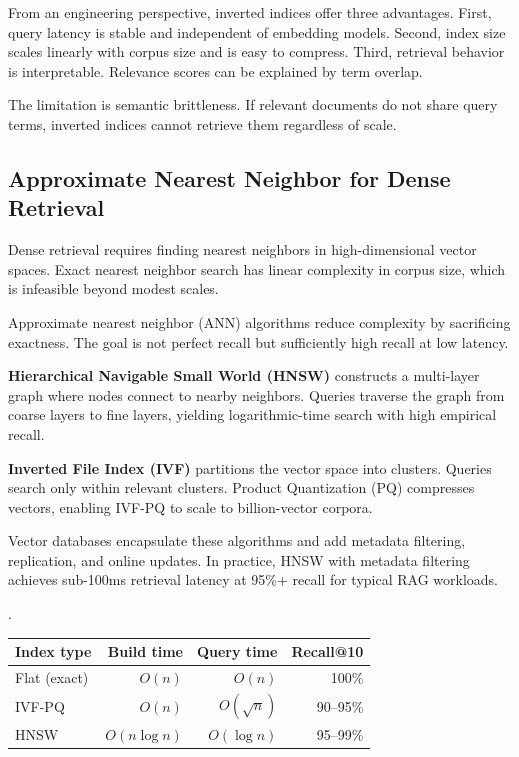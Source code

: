 From an engineering perspective, inverted indices offer three advantages. First, query latency is stable and independent of embedding models. Second, index size scales linearly with corpus size and is easy to compress. Third, retrieval behavior is interpretable. Relevance scores can be explained by term overlap.

The limitation is semantic brittleness. If relevant documents do not share query terms, inverted indices cannot retrieve them regardless of scale.

\subsection{Approximate Nearest Neighbor for Dense Retrieval}

Dense retrieval requires finding nearest neighbors in high-dimensional vector spaces. Exact nearest neighbor search has linear complexity in corpus size, which is infeasible beyond modest scales.

Approximate nearest neighbor (ANN) algorithms reduce complexity by sacrificing exactness. The goal is not perfect recall but sufficiently high recall at low latency.

\textbf{Hierarchical Navigable Small World (HNSW)} constructs a multi-layer graph where nodes connect to nearby neighbors. Queries traverse the graph from coarse layers to fine layers, yielding logarithmic-time search with high empirical recall.

\textbf{Inverted File Index (IVF)} partitions the vector space into clusters. Queries search only within relevant clusters. Product Quantization (PQ) compresses vectors, enabling IVF-PQ to scale to billion-vector corpora.

Vector databases encapsulate these algorithms and add metadata filtering, replication, and online updates. In practice, HNSW with metadata filtering achieves sub-100ms retrieval latency at 95\%+ recall for typical RAG workloads.

\begin{center}.
\begin{tabular}{lrrr}
\toprule
Index type & Build time & Query time & Recall@10 \\
\midrule
Flat (exact) & $O(n)$ & $O(n)$ & 100\% \\
IVF-PQ & $O(n)$ & $O(\sqrt{n})$ & 90--95\% \\
HNSW & $O(n \log n)$ & $O(\log n)$ & 95--99\% \\
\bottomrule
\end{tabular}
\end{center}

